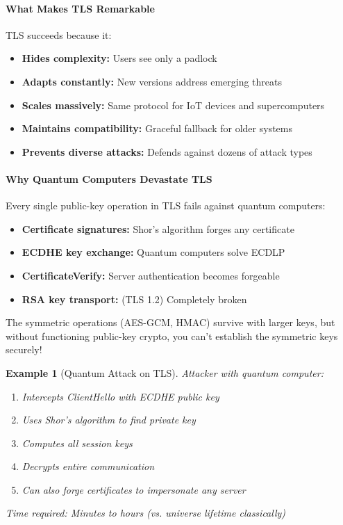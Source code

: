 \documentclass[11pt,a4paper]{article}
\newtheorem{example}{Example}
\begin{document}
\paragraph{What Makes TLS Remarkable}

TLS succeeds because it:
\begin{itemize}
    \item \textbf{Hides complexity:} Users see only a padlock
    \item \textbf{Adapts constantly:} New versions address emerging threats
    \item \textbf{Scales massively:} Same protocol for IoT devices and supercomputers
    \item \textbf{Maintains compatibility:} Graceful fallback for older systems
    \item \textbf{Prevents diverse attacks:} Defends against dozens of attack types
\end{itemize}

\paragraph{Why Quantum Computers Devastate TLS}

Every single public-key operation in TLS fails against quantum computers:

\begin{itemize}
    \item \textbf{Certificate signatures:} Shor's algorithm forges any certificate
    \item \textbf{ECDHE key exchange:} Quantum computers solve ECDLP
    \item \textbf{CertificateVerify:} Server authentication becomes forgeable
    \item \textbf{RSA key transport:} (TLS 1.2) Completely broken
\end{itemize}

The symmetric operations (AES-GCM, HMAC) survive with larger keys, but without functioning public-key crypto, you can't establish the symmetric keys securely!

\begin{example}[Quantum Attack on TLS]
Attacker with quantum computer:
\begin{enumerate}
    \item Intercepts ClientHello with ECDHE public key
    \item Uses Shor's algorithm to find private key
    \item Computes all session keys
    \item Decrypts entire communication
    \item Can also forge certificates to impersonate any server
\end{enumerate}
Time required: Minutes to hours (vs. universe lifetime classically)
\end{example}
\end{document}
